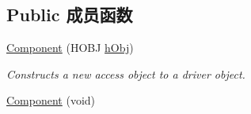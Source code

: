 \subsection*{Public 成员函数}
\begin{DoxyCompactItemize}
\item 
\hyperlink{classmv_i_m_p_a_c_t_1_1acquire_1_1_component_a392b380b6a537cdfa5d49fc8335326af}{Component} (H\+O\+B\+J \hyperlink{classmv_i_m_p_a_c_t_1_1acquire_1_1_component_access_a071d08bf770f55552998b86580e979de}{h\+Obj})
\begin{DoxyCompactList}\small\item\em Constructs a new access object to a driver object. \end{DoxyCompactList}\item 
\hypertarget{classmv_i_m_p_a_c_t_1_1acquire_1_1_component_ac70865f299e03af1264d462a0e5fb724}{\hyperlink{classmv_i_m_p_a_c_t_1_1acquire_1_1_component_ac70865f299e03af1264d462a0e5fb724}{Component} (void)}\label{classmv_i_m_p_a_c_t_1_1acquire_1_1_component_ac70865f299e03af1264d462a0e5fb724}


\end{DoxyCompactItemize}
